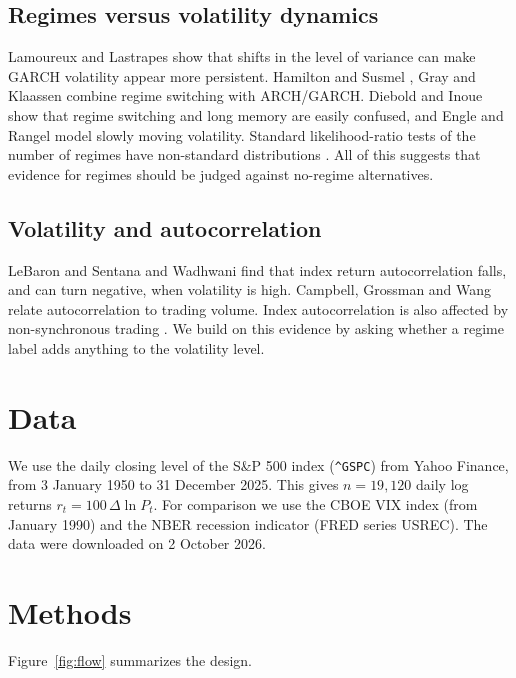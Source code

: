 \documentclass[conference]{IEEEtran}
\begin{document}
\subsection{Regimes versus volatility dynamics}
Lamoureux and Lastrapes \cite{lamoureux1990} show that shifts in the level of variance can make GARCH volatility appear more persistent. Hamilton and Susmel \cite{hamiltonsusmel1994}, Gray \cite{gray1996} and Klaassen \cite{klaassen2002} combine regime switching with ARCH/GARCH. Diebold and Inoue \cite{diebold2001} show that regime switching and long memory are easily confused, and Engle and Rangel \cite{engle2008} model slowly moving volatility. Standard likelihood-ratio tests of the number of regimes have non-standard distributions \cite{hansen1992}. All of this suggests that evidence for regimes should be judged against no-regime alternatives.

\subsection{Volatility and autocorrelation}
LeBaron \cite{lebaron1992} and Sentana and Wadhwani \cite{sentana1992} find that index return autocorrelation falls, and can turn negative, when volatility is high. Campbell, Grossman and Wang \cite{campbell1993} relate autocorrelation to trading volume. Index autocorrelation is also affected by non-synchronous trading \cite{lomackinlay1990}. We build on this evidence by asking whether a regime label adds anything to the volatility level.

\section{Data}

We use the daily closing level of the S\&P 500 index (\texttt{\textasciicircum GSPC}) from Yahoo Finance, from 3 January 1950 to 31 December 2025. This gives $n = 19{,}120$ daily log returns $r_t = 100\,\Delta \ln P_t$. For comparison we use the CBOE VIX index (from January 1990) and the NBER recession indicator (FRED series USREC). The data were downloaded on 2 October 2026.

\section{Methods}

Figure~\ref{fig:flow} summarizes the design.
\end{document}
